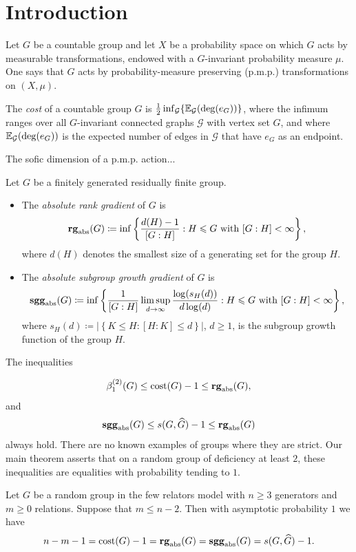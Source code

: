 \section{Introduction}\label{section: introduction}

Let $G$ be a countable group and let $X$ be a probability space on which $G$ acts by measurable transformations, endowed with a $G$-invariant probability measure $\mu$. One says that $G$ acts by probability-measure preserving (p.m.p.) transformations on $(X,\mu)$.

The \emph{cost} of a countable group $G$ is $\frac{1}{2}\inf_{\mathcal{G}}\{\mathbb{E}_{\mathcal{G}}(\deg(e_G))\}$, where the infimum ranges over all $G$-invariant connected graphs $\mathcal{G}$ with vertex set $G$, and where $\mathbb{E}_{\mathcal{G}}(\deg(e_G))$ is the expected number of edges in $\mathcal{G}$ that have $e_G$ as an endpoint. 

The sofic dimension of a p.m.p. action...

\begin{defn}
	Let $G$ be a finitely generated residually finite group.
	\begin{itemize}
	\item The \emph{absolute rank gradient} of $G$ is
	 \begin{equation}
		\mathbf{rg}_{\mathrm{abs}}(G)\coloneqq \inf\left\{\frac{d(H)-1}{[G:H]}  : H\leqslant G \text{ with }[G:H]<\infty \right\},
	\end{equation}
	where $d(H)$ denotes the smallest size of a generating set for the group $H$.
	\item The \emph{absolute subgroup growth gradient} of $G$ is	
	 \begin{equation}
	\mathbf{sgg}_{\mathrm{abs}}(G)\coloneqq \inf\left\{\frac{1}{[G:H]}\limsup_{d\to \infty}\frac{\log(s_H(d))}{d\log(d)}  : H\leqslant G \text{ with }[G:H]<\infty \right\},
\end{equation}
where $s_H(d)\coloneqq \left|\left\{K\leqslant H: [H:K]\le d\right\}\right|$, $d\ge 1$, is the subgroup growth function of the group $H$.
	\end{itemize}
\end{defn}

The inequalities

\begin{equation}
	\beta_1^{(2)}(G)\le \mathrm{cost}(G)-1\le \mathbf{rg}_{\mathrm{abs}}(G),
\end{equation}
and
\begin{equation}
	\mathbf{sgg}_{\mathrm{abs}}(G)\le s(G,\widehat{G})-1\le \mathbf{rg}_{\mathrm{abs}}(G)
\end{equation}
always hold. There are no known examples of groups where they are strict. Our main theorem asserts that on a random group of deficiency at least $2$, these inequalities are equalities with probability tending to $1$.
\begin{thm}
Let $G$ be a random group in the few relators model with $n\ge 3$ generators and $m\ge 0$ relations. Suppose that $m\le n-2$. Then with asymptotic probability $1$ we have
\[
n-m-1=\mathrm{cost}(G)-1=\mathbf{rg}_{\mathrm{abs}}(G)=\mathbf{sgg}_{\mathrm{abs}}(G)=s(G,\widehat{G})-1.
\]
\end{thm}